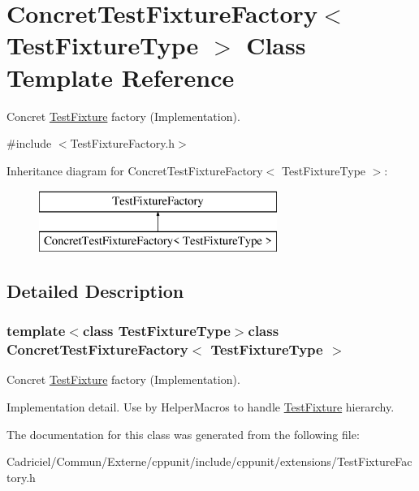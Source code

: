\hypertarget{class_concret_test_fixture_factory}{\section{Concret\-Test\-Fixture\-Factory$<$ Test\-Fixture\-Type $>$ Class Template Reference}
\label{class_concret_test_fixture_factory}
}


Concret \hyperlink{class_test_fixture}{Test\-Fixture} factory (Implementation).  




{\ttfamily \#include $<$Test\-Fixture\-Factory.\-h$>$}

Inheritance diagram for Concret\-Test\-Fixture\-Factory$<$ Test\-Fixture\-Type $>$\-:\begin{figure}[H]
\begin{center}
\leavevmode
\includegraphics[height=2.000000cm]{class_concret_test_fixture_factory}
\end{center}
\end{figure}


\subsection{Detailed Description}
\subsubsection*{template$<$class Test\-Fixture\-Type$>$class Concret\-Test\-Fixture\-Factory$<$ Test\-Fixture\-Type $>$}

Concret \hyperlink{class_test_fixture}{Test\-Fixture} factory (Implementation). 

Implementation detail. Use by Helper\-Macros to handle \hyperlink{class_test_fixture}{Test\-Fixture} hierarchy. 

The documentation for this class was generated from the following file\-:\begin{DoxyCompactItemize}
\item 
Cadriciel/\-Commun/\-Externe/cppunit/include/cppunit/extensions/Test\-Fixture\-Factory.\-h\end{DoxyCompactItemize}
